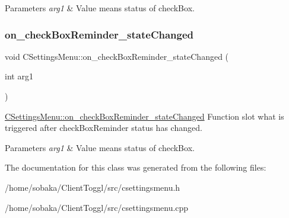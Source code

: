 \begin{DoxyParams}{Parameters}
{\em arg1} & Value means status of check\+Box. \\
\hline
\end{DoxyParams}
\mbox{\label{classCSettingsMenu_aeffe9813d7759a4250d464512b21f0d4}} 
\subsubsection{\texorpdfstring{on\+\_\+check\+Box\+Reminder\+\_\+state\+Changed}{on\_checkBoxReminder\_stateChanged}}
{\footnotesize\ttfamily void C\+Settings\+Menu\+::on\+\_\+check\+Box\+Reminder\+\_\+state\+Changed (\begin{DoxyParamCaption}\item[{int}]{arg1 }\end{DoxyParamCaption})\hspace{0.3cm}{\ttfamily [slot]}}



\hyperlink{classCSettingsMenu_aeffe9813d7759a4250d464512b21f0d4}{C\+Settings\+Menu\+::on\+\_\+check\+Box\+Reminder\+\_\+state\+Changed} Function slot what is triggered after check\+Box\+Reminder status has changed. 


\begin{DoxyParams}{Parameters}
{\em arg1} & Value means status of check\+Box. \\
\hline
\end{DoxyParams}


The documentation for this class was generated from the following files\+:\begin{DoxyCompactItemize}
\item 
/home/sobaka/\+Client\+Toggl/src/csettingsmenu.\+h\item 
/home/sobaka/\+Client\+Toggl/src/csettingsmenu.\+cpp\end{DoxyCompactItemize}

